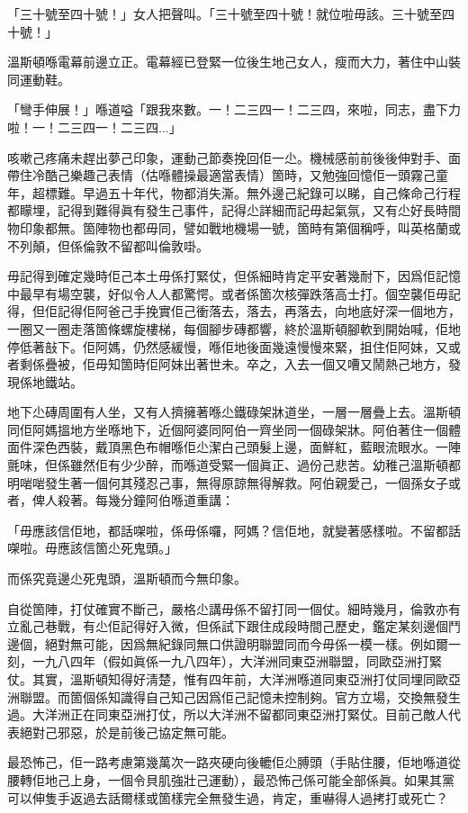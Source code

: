 「三十號至四十號！」女人把聲叫。「三十號至四十號！就位啦毋該。三十號至四十號！」

溫斯頓喺電幕前邊立正。電幕經已登緊一位後生地己女人，瘦而大力，著住中山裝同運動鞋。

「彎手伸展！」喺道嗌「跟我來數。一！二三四一！二三四，來啦，同志，盡下力啦！一！二三四一！二三四...」

咳嗽己疼痛未趕出夢己印𧰼，運動己節奏挽回佢一尐。機械感前前後後伸對手、面帶住冷酷己樂趣己表情（估喺體操最適當表情）箇時，又勉強回憶佢一頭霧己童年，超標難。早過五十年代，物都消失澌。無外邊己紀錄可以睇，自己條命己行程都矇埋，記得到難得眞有發生己事件，記得尐詳細而記毋起氣氛，又有尐好長時間物印𧰼都無。箇陣物也都毋同，譬如戰地機場一號，箇時有第個稱呼，叫英格蘭或不列顛，但係倫敦不留都叫倫敦啩。

毋記得到確定幾時佢己本土毋係打緊仗，但係細時肯定平安著幾耐下，因爲佢記憶中最早有場空襲，好似令人人都驚愕。或者係箇次核彈跌落高士打。個空襲佢毋記得，但佢記得佢阿爸己手挽實佢己衝落去，落去，再落去，向地底好深一個地方，一圈又一圈走落箇條螺旋樓梯，每個腳步磚都響，終於溫斯頓腳軟到開始喊，佢地停低著㪗下。佢阿媽，仍然感緩慢，喺佢地後面幾遠慢慢來緊，抯住佢阿妹，又或者剩係疊被，佢毋知箇時佢阿妹出著世未。卒之，入去一個又嘈又鬧熱己地方，發現係地鐵站。

地下尐磚周圍有人坐，又有人擠擁著喺尐鐵碌架牀道坐，一層一層疊上去。溫斯頓同佢阿媽搵地方坐喺地下，近個阿婆同阿伯一齊坐同一個碌架牀。阿伯著住一個體面件深色西裝，戴頂黑色布帽喺佢尐潔白己頭髮上邊，面鮮紅，藍眼流眼水。一陣氈味，但係雖然佢有少少醉，而喺道受緊一個眞正、過份己悲苦。幼稚己溫斯頓都明啱啱發生著一個何其殘忍己事，無得原諒無得解救。阿伯親愛己，一個孫女子或者，俾人殺著。每幾分鐘阿伯喺道重講：

「毋應該信佢地，都話㗎啦，係毋係囉，阿媽？信佢地，就變著感樣啦。不留都話㗎啦。毋應該信箇尐死鬼頭。」

而係究竟邊尐死鬼頭，溫斯頓而今無印𧰼。

自從箇陣，打仗確實不斷己，嚴格尐講毋係不留打同一個仗。細時幾月，倫敦亦有立亂己巷戰，有尐佢記得好入微，但係試下跟住成段時間己歷史，鑑定某刻邊個鬥邊個，絕對無可能，因爲無紀錄同無口供證明聯盟同而今毋係一模一樣。例如爾一刻，一九八四年（假如眞係一九八四年），大洋洲同東亞洲聯盟，同歐亞洲打緊仗。其實，溫斯頓知得好淸楚，惟有四年前，大洋洲喺道同東亞洲打仗同埋同歐亞洲聯盟。而箇個係知識得自己知己因爲佢己記憶未控制夠。官方立場，交換無發生過。大洋洲正在同東亞洲打仗，所以大洋洲不留都同東亞洲打緊仗。目前己敵人代表絕對己邪惡，於是前後己協定無可能。

最恐怖己，佢一路考慮第幾萬次一路夾硬向後轆佢尐膊頭（手貼住腰，佢地喺道從腰轉佢地己上身，一個令貝肌強壯己運動），最恐怖己係可能全部係眞。如果其黨可以伸隻手返過去話爾樣或箇樣完全無發生過，肯定，重嚇得人過拷打或死亡？


